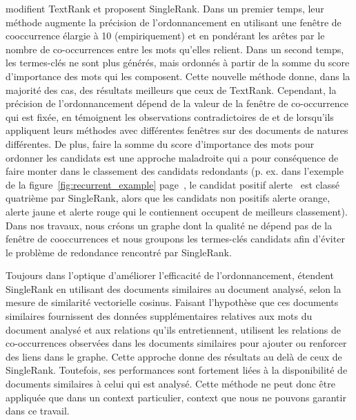     modifient TextRank et proposent SingleRank. Dans
    un premier temps, leur méthode augmente la précision de l'ordonnancement en
    utilisant une fenêtre de cooccurrence élargie à 10 (empiriquement) et en
    pondérant les arêtes par le nombre de co-occurrences entre les mots qu'elles
    relient. Dans un second temps, les termes-clés ne sont plus générés, mais
    ordonnés à partir de la somme du score d'importance des mots qui les
    composent. Cette nouvelle méthode donne, dans la majorité des cas, des
    résultats meilleurs que ceux de TextRank. Cependant, la précision de
    l'ordonnancement dépend de la valeur de la fenêtre de co-occurrence qui est
    fixée, en témoignent les observations contradictoires de
     et de  lorsqu'ils
    appliquent leurs méthodes avec différentes fenêtres sur des documents de
    natures différentes. De plus, faire la somme du score d'importance des mots
    pour ordonner les candidats est une approche maladroite qui a pour
    conséquence de faire monter dans le classement des candidats redondants (p.
    ex. dans l'exemple de la figure~\ref{fig:recurrent_example}
    page~\pageref{fig:recurrent_example}, le candidat positif \og{}alerte~\fg{}
    est classé quatrième par SingleRank, alors que les candidats non positifs
    \og{}alerte orange\fg{}, \og{}alerte jaune\fg{} et \og{}alerte rouge\fg{}
    qui le contiennent occupent de meilleurs classement). Dans nos travaux, nous
    créons un graphe dont la qualité ne dépend pas de la fenêtre de
    cooccurrences et nous groupons les termes-clés candidats afin d'éviter le
    problème de redondance rencontré par SingleRank.

    Toujours dans l'optique d'améliorer l'efficacité de l'ordonnancement,
     étendent SingleRank en utilisant des documents
    similaires au document analysé, selon la mesure de similarité vectorielle
    cosinus. Faisant l'hypothèse que ces documents similaires fournissent des
    données supplémentaires relatives aux mots du document analysé et aux
    relations qu'ils entretiennent,  utilisent les
    relations de co-occurrences observées dans les documents similaires pour
    ajouter ou renforcer des liens dans le graphe. Cette approche donne des
    résultats au delà de ceux de SingleRank. Toutefois, ses performances sont
    fortement liées à la disponibilité de documents similaires à celui qui est
    analysé. Cette méthode ne peut donc être appliquée que dans un context
    particulier, context que nous ne pouvons garantir dans ce travail.

